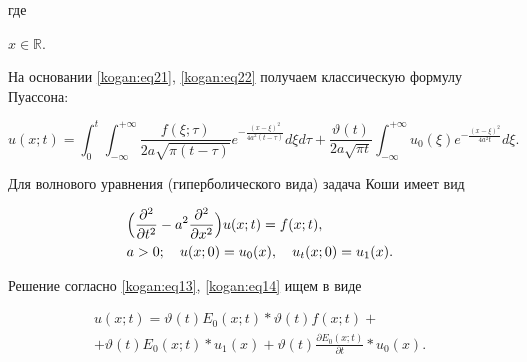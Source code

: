 где 

$x\in \mathbb R$. 



На основании \eqref{kogan:eq21}, \eqref{kogan:eq22} получаем классическую формулу Пуассона:

\begin{equation}

\label{kogan:eq23}

u(x;t)\! = \!\int_0^t \int_{-\infty }^{+\infty } \frac{f(\xi;\tau)}{2a\sqrt{ 

\pi (t-\tau )} }  e^{-\frac{(x-\xi )^2}{4a^2(t-\tau )}} d\xi d\tau 

\!+\! \frac{\vartheta (t)}{2a\sqrt {\pi t} }\int_{-\infty}^{+\infty } u_0 (\xi)e^{-\frac{(x-\xi)^2}{4a^2t}}d\xi.

\end{equation}





Для волнового уравнения (гиперболического вида) задача Коши имеет вид

\begin{equation}

\label{kogan:eq24}

\begin{aligned}

& \Bigl( \frac{\partial ^2}{\partial t^2}-a^2\frac{\partial ^2}{\partial 

x^2} \Bigr)u(x;t)=f(x;t),\\

& a>0;

\quad

u(x;0)=u_0 (x),

\quad

u_t (x;0)=u_1 (x).

\end{aligned}

\end{equation}

 

 

Решение согласно \eqref{kogan:eq13}, \eqref{kogan:eq14} ищем в виде

\begin{multline}

\label{kogan:eq25}

u(x;t)=\vartheta (t)E_0 (x;t)\ast \vartheta (t)f(x;t) +

\\ +\vartheta (t)E_0 

(x;t)\ast u_1 (x)

+\vartheta (t)\frac{\partial E_0 (x;t)}{\partial t}\ast u_0 

(x).

\end{multline}



